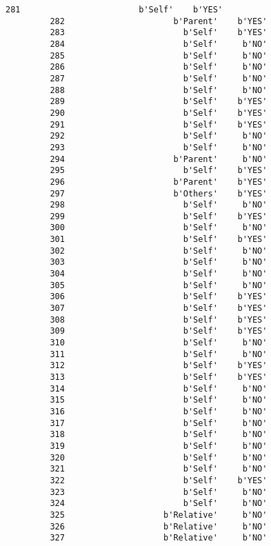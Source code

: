 \documentclass[11pt]{article}
\begin{document}
\begin{Verbatim}[commandchars=\\\{\}]
         281                        b'Self'    b'YES'  
         282                      b'Parent'    b'YES'  
         283                        b'Self'    b'YES'  
         284                        b'Self'     b'NO'  
         285                        b'Self'     b'NO'  
         286                        b'Self'     b'NO'  
         287                        b'Self'     b'NO'  
         288                        b'Self'     b'NO'  
         289                        b'Self'    b'YES'  
         290                        b'Self'    b'YES'  
         291                        b'Self'    b'YES'  
         292                        b'Self'     b'NO'  
         293                        b'Self'     b'NO'  
         294                      b'Parent'     b'NO'  
         295                        b'Self'    b'YES'  
         296                      b'Parent'    b'YES'  
         297                      b'Others'    b'YES'  
         298                        b'Self'     b'NO'  
         299                        b'Self'    b'YES'  
         300                        b'Self'     b'NO'  
         301                        b'Self'    b'YES'  
         302                        b'Self'     b'NO'  
         303                        b'Self'     b'NO'  
         304                        b'Self'     b'NO'  
         305                        b'Self'     b'NO'  
         306                        b'Self'    b'YES'  
         307                        b'Self'    b'YES'  
         308                        b'Self'    b'YES'  
         309                        b'Self'    b'YES'  
         310                        b'Self'     b'NO'  
         311                        b'Self'     b'NO'  
         312                        b'Self'    b'YES'  
         313                        b'Self'    b'YES'  
         314                        b'Self'     b'NO'  
         315                        b'Self'     b'NO'  
         316                        b'Self'     b'NO'  
         317                        b'Self'     b'NO'  
         318                        b'Self'     b'NO'  
         319                        b'Self'     b'NO'  
         320                        b'Self'     b'NO'  
         321                        b'Self'     b'NO'  
         322                        b'Self'    b'YES'  
         323                        b'Self'     b'NO'  
         324                        b'Self'     b'NO'  
         325                    b'Relative'     b'NO'  
         326                    b'Relative'     b'NO'  
         327                    b'Relative'     b'NO'  

\end{Verbatim}
\end{document}
